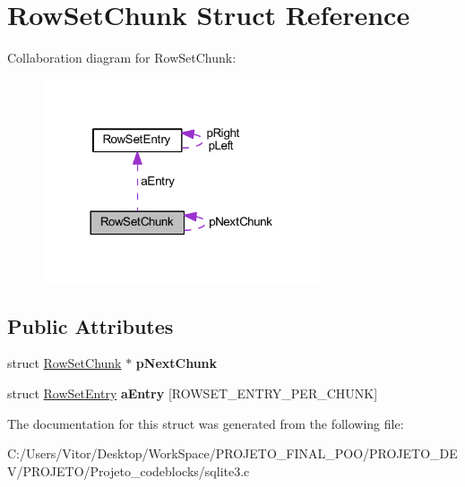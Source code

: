 \hypertarget{struct_row_set_chunk}{\section{Row\-Set\-Chunk Struct Reference}
\label{struct_row_set_chunk}
}


Collaboration diagram for Row\-Set\-Chunk\-:\nopagebreak
\begin{figure}[H]
\begin{center}
\leavevmode
\includegraphics[width=233pt]{struct_row_set_chunk__coll__graph}
\end{center}
\end{figure}
\subsection*{Public Attributes}
\begin{DoxyCompactItemize}
\item 
\hypertarget{struct_row_set_chunk_ae8f0975c86633ae2bb8b212d3a767554}{struct \hyperlink{struct_row_set_chunk}{Row\-Set\-Chunk} $\ast$ {\bfseries p\-Next\-Chunk}}\label{struct_row_set_chunk_ae8f0975c86633ae2bb8b212d3a767554}

\item 
\hypertarget{struct_row_set_chunk_abde97bbb07c3bf9454e719ff860bdd1f}{struct \hyperlink{struct_row_set_entry}{Row\-Set\-Entry} {\bfseries a\-Entry} \mbox{[}R\-O\-W\-S\-E\-T\-\_\-\-E\-N\-T\-R\-Y\-\_\-\-P\-E\-R\-\_\-\-C\-H\-U\-N\-K\mbox{]}}\label{struct_row_set_chunk_abde97bbb07c3bf9454e719ff860bdd1f}

\end{DoxyCompactItemize}


The documentation for this struct was generated from the following file\-:\begin{DoxyCompactItemize}
\item 
C\-:/\-Users/\-Vitor/\-Desktop/\-Work\-Space/\-P\-R\-O\-J\-E\-T\-O\-\_\-\-F\-I\-N\-A\-L\-\_\-\-P\-O\-O/\-P\-R\-O\-J\-E\-T\-O\-\_\-\-D\-E\-V/\-P\-R\-O\-J\-E\-T\-O/\-Projeto\-\_\-codeblocks/sqlite3.\-c\end{DoxyCompactItemize}
